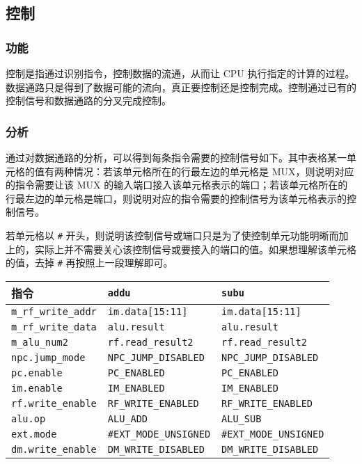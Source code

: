 \hypertarget{ux63a7ux5236}{%
\subsection{控制}\label{ux63a7ux5236}}

\hypertarget{ux529fux80fd-12}{%
\subsubsection{功能}\label{ux529fux80fd-12}}

控制是指通过识别指令，控制数据的流通，从而让 CPU
执行指定的计算的过程。数据通路只是得到了数据可能的流向，真正要控制还是控制完成。控制通过已有的控制信号和数据通路的分叉完成控制。

\hypertarget{ux5206ux6790-1}{%
\subsubsection{分析}\label{ux5206ux6790-1}}

通过对数据通路的分析，可以得到每条指令需要的控制信号如下。其中表格某一单元格的值有两种情况：若该单元格所在的行最左边的单元格是
MUX，则说明对应的指令需要让该 MUX
的输入端口接入该单元格表示的端口；若该单元格所在的行最左边的单元格是端口，则说明对应的指令需要的控制信号为该单元格表示的控制信号。

若单元格以 \texttt{\#}
开头，则说明该控制信号或端口只是为了使控制单元功能明晰而加上的，实际上并不需要关心该控制信号或要接入的端口的值。如果想理解该单元格的值，去掉
\texttt{\#} 再按照上一段理解即可。

\begin{longtable}[]{@{}lll@{}}
\toprule
指令 & \texttt{addu} & \texttt{subu}\tabularnewline
\midrule
\endhead
\texttt{m\_rf\_write\_addr} & \texttt{im.data{[}15:11{]}} &
\texttt{im.data{[}15:11{]}}\tabularnewline
\texttt{m\_rf\_write\_data} & \texttt{alu.result} &
\texttt{alu.result}\tabularnewline
\texttt{m\_alu\_num2} & \texttt{rf.read\_result2} &
\texttt{rf.read\_result2}\tabularnewline
\texttt{npc.jump\_mode} & \texttt{NPC\_JUMP\_DISABLED} &
\texttt{NPC\_JUMP\_DISABLED}\tabularnewline
\texttt{pc.enable} & \texttt{PC\_ENABLED} &
\texttt{PC\_ENABLED}\tabularnewline
\texttt{im.enable} & \texttt{IM\_ENABLED} &
\texttt{IM\_ENABLED}\tabularnewline
\texttt{rf.write\_enable} & \texttt{RF\_WRITE\_ENABLED} &
\texttt{RF\_WRITE\_ENABLED}\tabularnewline
\texttt{alu.op} & \texttt{ALU\_ADD} & \texttt{ALU\_SUB}\tabularnewline
\texttt{ext.mode} & \texttt{\#EXT\_MODE\_UNSIGNED} &
\texttt{\#EXT\_MODE\_UNSIGNED}\tabularnewline
\texttt{dm.write\_enable} & \texttt{DM\_WRITE\_DISABLED} &
\texttt{DM\_WRITE\_DISABLED}\tabularnewline
\bottomrule
\end{longtable}

